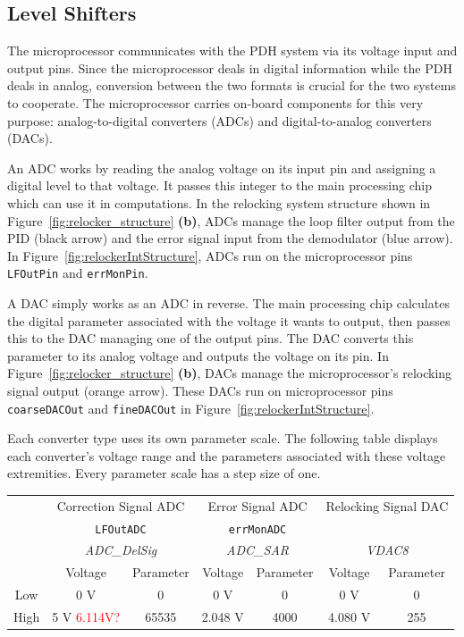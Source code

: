\documentclass[10pt]{report}
\newcommand{\LFOutADC}[0] {\texttt{LFOutADC}}
\newcommand{\LFOutPin}[0] {\texttt{LFOutPin}}
\newcommand{\errMonADC}[0] {\texttt{errMonADC}}
\newcommand{\errMonPin}[0] {\texttt{errMonPin}}
\newcommand{\coarseDACOut}[0] {\texttt{coarseDACOut}}
\newcommand{\fineDACOut}[0] {\texttt{fineDACOut}}
\begin{document}
\subsection{Level Shifters}

The microprocessor communicates with the PDH system via its voltage input and output pins. Since the microprocessor deals in digital information while the PDH deals in analog, conversion between the two formats is crucial for the two systems to cooperate. The microprocessor carries on-board components for this very purpose: analog-to-digital converters (ADCs) and digital-to-analog converters (DACs).

An ADC works by reading the analog voltage on its input pin and assigning a digital level to that voltage. It passes this integer to the main processing chip which can use it in computations. In the relocking system structure shown in Figure~\ref{fig:relocker_structure} \textbf{(b)}, ADCs manage the loop filter output from the PID (black arrow) and the error signal input from the demodulator (blue arrow). In Figure~\ref{fig:relockerIntStructure}, ADCs run on the microprocessor pins \LFOutPin{} and \errMonPin.

A DAC simply works as an ADC in reverse. The main processing chip calculates the digital parameter associated with the voltage it wants to output, then passes this to the DAC managing one of the output pins. The DAC converts this parameter to its analog voltage and outputs the voltage on its pin. In Figure~\ref{fig:relocker_structure} \textbf{(b)}, DACs manage the microprocessor's relocking signal output (orange arrow). These DACs run on microprocessor pins \coarseDACOut{}  and \fineDACOut{}  in Figure~\ref{fig:relockerIntStructure}.

Each converter type uses its own parameter scale. The following table displays each converter's voltage range and the parameters associated with these voltage extremities. Every parameter scale has a step size of one.

\begin{center}
\begin{tabular}{ c||c|c||c|c||c|c }
& \multicolumn{2}{c||}{Correction Signal ADC} & \multicolumn{2}{c||}{Error Signal ADC} & \multicolumn{2}{c}{Relocking Signal DAC} \\
& \multicolumn{2}{c||}{\LFOutADC{} } & \multicolumn{2}{c||}{\errMonADC{} } & \multicolumn{2}{c}{ } \\
& \multicolumn{2}{c||}{\textit{ADC\_DelSig}} & \multicolumn{2}{c||}{\textit{ADC\_SAR}} & \multicolumn{2}{c}{\textit{VDAC8}} \\
\hline
& Voltage & Parameter & Voltage & Parameter & Voltage & Parameter \\
\hline
Low & 0 V & 0 & 0 V & 0 & 0 V & 0 \\
\hline
High & 5 V \textcolor{red}{6.114V?} & 65535 & 2.048 V & 4000 & 4.080 V & 255
\end{tabular}
\end{center}
\end{document}

